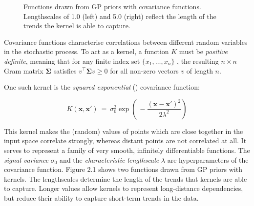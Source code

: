 \documentclass[a4paper,12pt ]{report}
\renewcommand{\GP}{{GP}}
\begin{document}
\begin{figure} [!ht]

{\caption{{Functions drawn from {\GP} priors with {\SE} covariance functions. Lengthscales of 1.0 (left) and 5.0 (right) reflect the length of the trends the kernel is able to capture.  }}}

\end{figure}



Covariance functions characterise correlations between different random variables in the stochastic process. To act as a kernel, a function $K$ must be \emph{positive definite}, meaning that for any finite index set $\{ x_1, \ldots, x_n \}$ , the resulting $n \times n$ Gram matrix $\mathbf{\Sigma}$ satisfies $ v^\top \mathbf{\Sigma} v \geq 0$ for all non-zero vectors $v$ of length $n$.

One such kernel is the \emph{squared exponential} (\SE) covariance function:

\begin{equation*} K(\mathbf{x}, \mathbf{x'}) ~=~ \sigma_0^2  \exp \left(  ~- \frac{(\mathbf{x}-\mathbf{x'})^2}{{2 {\lambda^2}}} \right) \end{equation*}

This kernel makes the (random) values of points which are close together in the input space correlate strongly, whereas distant points are not correlated at all. It serves to represent a family of very smooth, infinitely differentiable functions. The \emph{signal variance} $\sigma_0$ and the \emph{characteristic lengthscale} $\lambda$ are hyperparameters of the covariance function. Figure 2.1 shows two functions drawn from {\GP} priors with {\SE} kernels. The lengthscales determine the length of the trends that kernels are able to capture. Longer values allow kernels to represent long-distance dependencies, but reduce their ability to capture short-term trends in the data.
\end{document}

